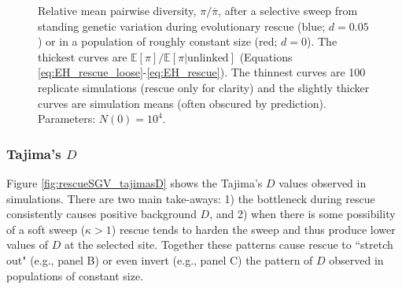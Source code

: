 \documentclass[]{article}
\begin{document}
\begin{figure}[htb]
\caption{
Relative mean pairwise diversity, $\pi/\overline{\pi}$, after a selective sweep from standing genetic variation during evolutionary rescue (blue; $d=0.05$) or in a population of roughly constant size (red; $d=0$).
The thickest curves are $\mathbb{E}[\pi]/\mathbb{E}[\pi|\mathrm{unlinked}]$ (Equations \ref{eq:EH_rescue_loose}-\ref{eq:EH_rescue}).
The thinnest curves are 100 replicate simulations (rescue only for clarity) and the slightly thicker curves are simulation means (often obscured by prediction).
Parameters: $N(0)=10^4$.
}%
\label{fig:rescueSGV_heterozygosity_relative}
\end{figure}

\subsubsection*{Tajima's $D$}

Figure \ref{fig:rescueSGV_tajimasD} shows the Tajima's $D$ values observed in simulations.
There are two main take-aways:
1) the bottleneck during rescue consistently causes positive background $D$, and
2) when there is some possibility of a soft sweep ($\kappa>1$) rescue tends to harden the sweep and thus produce lower values of $D$ at the selected site.
Together these patterns cause rescue to ``stretch out" (e.g., panel B) or even invert (e.g., panel C) the pattern of $D$ observed in populations of constant size.
\end{document}
